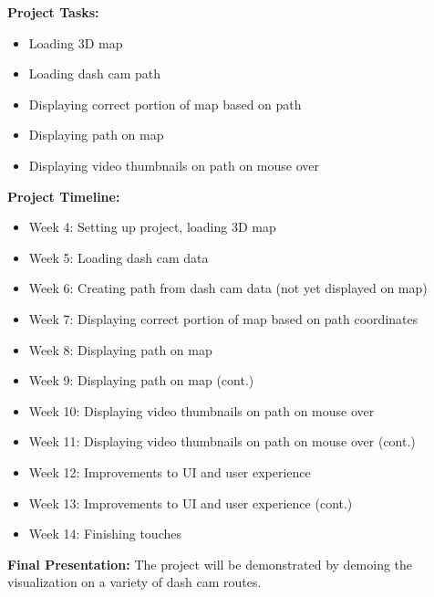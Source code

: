 \documentclass{article}
\begin{document}
\textbf{Project Tasks:}
\begin{itemize}
    \item Loading 3D map
    \item Loading dash cam path
    \item Displaying correct portion of map based on path
    \item Displaying path on map
    \item Displaying video thumbnails on path on mouse over
\end{itemize}

\textbf{Project Timeline:}
\begin{itemize}
    \item Week 4: Setting up project, loading 3D map
    \item Week 5: Loading dash cam data
    \item Week 6: Creating path from dash cam data (not yet displayed on map)
    \item Week 7: Displaying correct portion of map based on path coordinates
    \item Week 8: Displaying path on map
    \item Week 9: Displaying path on map (cont.)
    \item Week 10: Displaying video thumbnails on path on mouse over
    \item Week 11: Displaying video thumbnails on path on mouse over (cont.)
    \item Week 12: Improvements to UI and user experience
    \item Week 13: Improvements to UI and user experience (cont.)
    \item Week 14: Finishing touches
\end{itemize}

\textbf{Final Presentation:} The project will be demonstrated by demoing the visualization on a variety of dash cam routes.
\end{document}

